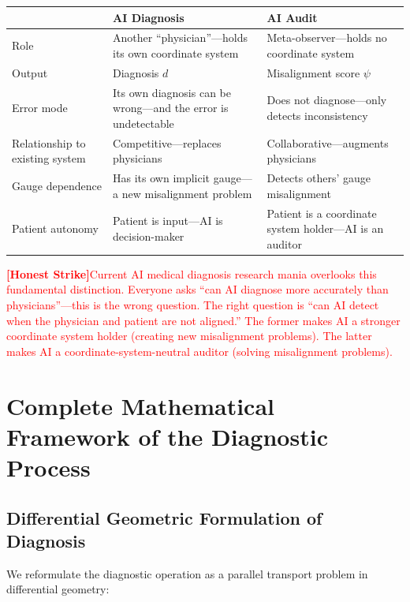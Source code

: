 \documentclass[12pt,a4paper]{article}
\theoremstyle{remark}
\newcommand{\honestcrit}[1]{%
    \textcolor{red}{\textbf{[Honest Strike]}#1}%
}
\begin{document}
\begin{center}
\begin{tabular}{p{4cm} p{5cm} p{5cm}}
\toprule
& \textbf{AI Diagnosis} & \textbf{AI Audit} \\
\midrule
Role & Another ``physician''---holds its own coordinate system & Meta-observer---holds no coordinate system \\
Output & Diagnosis $d$ & Misalignment score $\psi$ \\
Error mode & Its own diagnosis can be wrong---and the error is undetectable & Does not diagnose---only detects inconsistency \\
Relationship to existing system & Competitive---replaces physicians & Collaborative---augments physicians \\
Gauge dependence & Has its own implicit gauge---a new misalignment problem & Detects others' gauge misalignment \\
Patient autonomy & Patient is input---AI is decision-maker & Patient is a coordinate system holder---AI is an auditor \\
\bottomrule
\end{tabular}
\end{center}

\honestcrit{Current AI medical diagnosis research mania overlooks this fundamental distinction. Everyone asks ``can AI diagnose more accurately than physicians''---this is the wrong question. The right question is ``can AI detect when the physician and patient are not aligned.'' The former makes AI a stronger coordinate system holder (creating new misalignment problems). The latter makes AI a coordinate-system-neutral auditor (solving misalignment problems).}

\section{Complete Mathematical Framework of the Diagnostic Process}
\label{sec:framework}

\subsection{Differential Geometric Formulation of Diagnosis}

We reformulate the diagnostic operation as a parallel transport problem in differential geometry:
\end{document}
